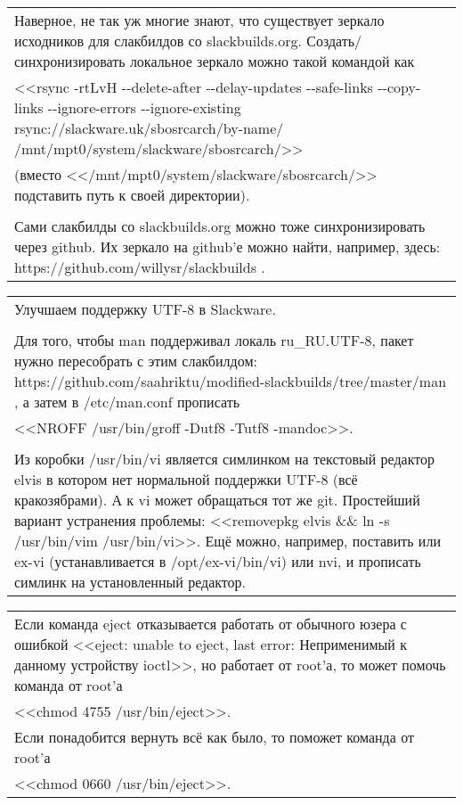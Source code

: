 \documentclass[14pt,openany]{book}
\begin{document}
\begin{center}
\begin{tabular}{|p{\textwidth}|}
\hline
Наверное, не так уж многие знают, что существует зеркало исходников для слакбилдов со slackbuilds.org. Создать/синхронизировать локальное зеркало можно такой командой как \\
<<rsync -rtLvH -{}-delete-after -{}-delay-updates -{}-safe-links -{}-copy-links -{}-ignore-errors -{}-ignore-existing rsync://slackware.uk/sbosrcarch/by-name/ /mnt/mpt0/system/slackware/sbosrcarch/>> \\
(вместо <</mnt/mpt0/system/slackware/sbosrcarch/>> подставить путь к своей директории). \\
 \\
Сами слакбилды со slackbuilds.org можно тоже синхронизировать через github. Их зеркало на github'е можно найти, например, здесь: https://github.com/willysr/slackbuilds . \\
\hline
\end{tabular}
\begin{tabular}{|p{\textwidth}|}
\hline
Улучшаем поддержку UTF-8 в Slackware. \\
 \\
Для того, чтобы man поддерживал локаль ru\_RU.UTF-8, пакет нужно пересобрать с этим слакбилдом: https://github.com/saahriktu/modified-slackbuilds/tree/master/man , а затем в /etc/man.conf прописать \\
<<NROFF /usr/bin/groff -Dutf8 -Tutf8 -mandoc>>. \\
 \\
Из коробки /usr/bin/vi является симлинком на текстовый редактор elvis в котором нет нормальной поддержки UTF-8 (всё кракозябрами). А к vi может обращаться тот же git. Простейший вариант устранения проблемы: <<removepkg elvis \&\& ln -s /usr/bin/vim /usr/bin/vi>>. Ещё можно, например, поставить или ex-vi (устанавливается в /opt/ex-vi/bin/vi) или nvi, и прописать симлинк на установленный редактор. \\
\hline
\end{tabular}
\begin{tabular}{|p{\textwidth}|}
\hline
Если команда eject отказывается работать от обычного юзера с ошибкой <<eject: unable to eject, last error: Неприменимый к данному устройству ioctl>>, но работает от root'а, то может помочь команда от root'а \\
<<chmod 4755 /usr/bin/eject>>. \\
Если понадобится вернуть всё как было, то поможет команда от root'а \\
<<chmod 0660 /usr/bin/eject>>. \\
\hline
\end{tabular}

\end{center}
\end{document}
